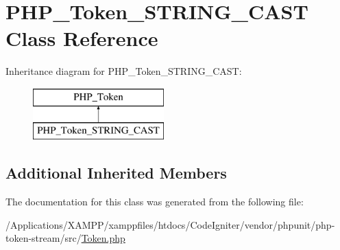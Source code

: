 \hypertarget{class_p_h_p___token___s_t_r_i_n_g___c_a_s_t}{}\section{P\+H\+P\+\_\+\+Token\+\_\+\+S\+T\+R\+I\+N\+G\+\_\+\+C\+A\+ST Class Reference}
\label{class_p_h_p___token___s_t_r_i_n_g___c_a_s_t}
Inheritance diagram for P\+H\+P\+\_\+\+Token\+\_\+\+S\+T\+R\+I\+N\+G\+\_\+\+C\+A\+ST\+:\begin{figure}[H]
\begin{center}
\leavevmode
\includegraphics[height=2.000000cm]{class_p_h_p___token___s_t_r_i_n_g___c_a_s_t}
\end{center}
\end{figure}
\subsection*{Additional Inherited Members}


The documentation for this class was generated from the following file\+:\begin{DoxyCompactItemize}
\item 
/\+Applications/\+X\+A\+M\+P\+P/xamppfiles/htdocs/\+Code\+Igniter/vendor/phpunit/php-\/token-\/stream/src/\mbox{\hyperlink{_token_8php}{Token.\+php}}\end{DoxyCompactItemize}
